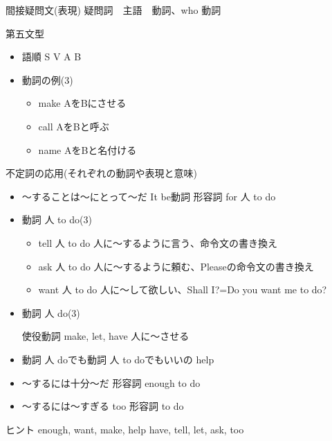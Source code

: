 \documentclass[10pt]{jsarticle}
\newcommand{\answer}[2]{{\color{orange}#2}}
\newcommand{\answer}[2]{\vspace{#1mm}}
\begin{document}
\begin{itembox}[l]{間接疑問文(表現)}
	\answer{10}{疑問詞　主語　動詞、who 動詞}
\end{itembox}

\begin{itembox}[l]{第五文型}
	\begin{itemize}
		\item 語順 \answer{10}{S V A B}
		\item 動詞の例(3)\answer{20}{
			      \begin{multicols}{3}
				      \begin{itemize}
					      \item make \answer{5}{AをBにさせる}
					      \item call \answer{5}{AをBと呼ぶ}
					      \item name \answer{5}{AをBと名付ける}
				      \end{itemize}
			      \end{multicols}
		      }
	\end{itemize}
\end{itembox}

\begin{itembox}[l]{不定詞の応用(それぞれの動詞や表現と意味)}
	\begin{itemize}
		\item 〜することは〜にとって〜だ \answer{10}{It be動詞 形容詞 for 人 to do}
		\item 動詞 人 to do(3)\answer{20}{
			      \begin{itemize}
				      \item tell 人 to do 人に〜するように言う、命令文の書き換え
				      \item ask 人 to do 人に〜するように頼む、Pleaseの命令文の書き換え
				      \item want 人 to do 人に〜して欲しい、Shall I?=Do you want me to do?
			      \end{itemize}

		      }
		\item 動詞 人 do(3)\answer{20}{
			      使役動詞 make, let, have 人に〜させる

		      }

		\item 動詞 人 doでも動詞 人 to doでもいいの \answer{10}{help}
		\item 〜するには十分〜だ \answer{5}{形容詞 enough to do}
		\item 〜するには〜すぎる \answer{5}{too 形容詞 to do}
	\end{itemize}
	\begin{itembox}[l]{ヒント}
		enough, want, make, help have, tell, let, ask, too
	\end{itembox}
\end{itembox}
\end{document}
